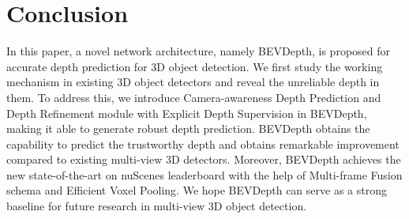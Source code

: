\documentclass[twocolumn,letterpaper]{article}
\begin{document}
\section{Conclusion}

In this paper, a novel network architecture, namely BEVDepth, is proposed for accurate depth prediction for 3D object detection. We first study the working mechanism in existing 3D object detectors and reveal the unreliable depth in them. To address this, we introduce Camera-awareness Depth Prediction and Depth Refinement module with Explicit Depth Supervision in BEVDepth, making it able to generate robust depth prediction. BEVDepth obtains the capability to predict the trustworthy depth and obtains remarkable improvement compared to existing multi-view 3D detectors. Moreover, BEVDepth achieves the new state-of-the-art on nuScenes leaderboard with the help of Multi-frame Fusion schema and Efficient Voxel Pooling. We hope BEVDepth can serve as a strong baseline for future research in multi-view 3D object detection.


\end{document}
